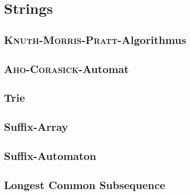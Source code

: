 \section{Strings}

\subsection{\textsc{Knuth-Morris-Pratt}-Algorithmus}


\subsection{\textsc{Aho-Corasick}-Automat}


\subsection{Trie}


\subsection{Suffix-Array}


\subsection{Suffix-Automaton}


\subsection{Longest Common Subsequence}

